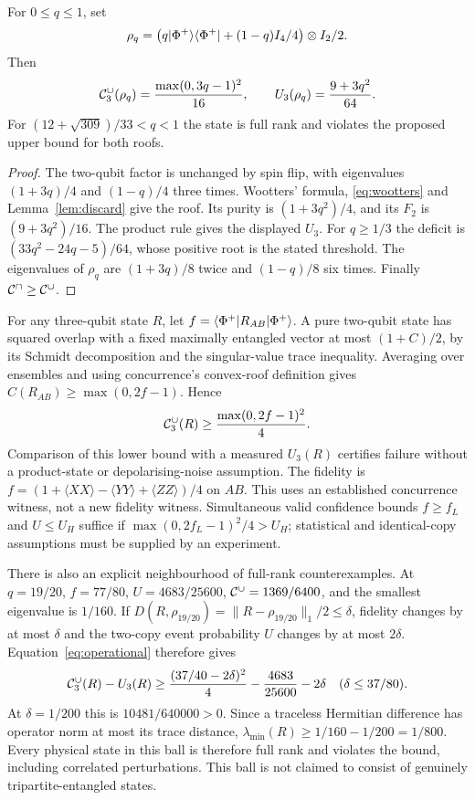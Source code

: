 \begin{theorem}\label{thm:noisy}
For $0\leq q\leq1$, set
\[
\rho_q=\left(q\lvert \Phi^+\rangle\langle \Phi^+\rvert+(1-q)I_4/4\right)\otimes I_2/2.
\]
Then
\[
\mathcal C_3^\cup(\rho_q)=\frac{\max(0,3q-1)^2}{16},\qquad
U_3(\rho_q)=\frac{9+3q^2}{64}.
\]
For $(12+\sqrt{309})/33<q<1$ the state is full rank and violates the proposed upper bound for both roofs.
\end{theorem}
\begin{proof}
The two-qubit factor is unchanged by spin flip, with eigenvalues $(1+3q)/4$ and $(1-q)/4$ three times. Wootters' formula, \eqref{eq:wootters} and Lemma~\ref{lem:discard} give the roof. Its purity is $(1+3q^2)/4$, and its $F_2$ is $(9+3q^2)/16$. The product rule gives the displayed $U_3$. For $q\geq1/3$ the deficit is $(33q^2-24q-5)/64$, whose positive root is the stated threshold. The eigenvalues of $\rho_q$ are $(1+3q)/8$ twice and $(1-q)/8$ six times. Finally $\mathcal C^\cap\geq\mathcal C^\cup$.
\end{proof}

For any three-qubit state $R$, let $f=\langle \Phi^+\rvert R_{AB}\lvert \Phi^+\rangle$. A pure two-qubit state has squared overlap with a fixed maximally entangled vector at most $(1+C)/2$, by its Schmidt decomposition and the singular-value trace inequality. Averaging over ensembles and using concurrence's convex-roof definition gives $C(R_{AB})\geq\max(0,2f-1)$. Hence
\begin{equation}\label{eq:operational}
\mathcal C_3^\cup(R)\geq\frac{\max(0,2f-1)^2}{4}.
\end{equation}
Comparison of this lower bound with a measured $U_3(R)$ certifies failure without a product-state or depolarising-noise assumption. The fidelity is $f=(1+\langle XX\rangle-\langle YY\rangle+\langle ZZ\rangle)/4$ on $AB$. This uses an established concurrence witness, not a new fidelity witness. Simultaneous valid confidence bounds $f\geq f_L$ and $U\leq U_H$ suffice if $\max(0,2f_L-1)^2/4>U_H$; statistical and identical-copy assumptions must be supplied by an experiment.

There is also an explicit neighbourhood of full-rank counterexamples. At $q=19/20$, $f=77/80$, $U=4683/25600$, $\mathcal C^\cup=1369/6400$, and the smallest eigenvalue is $1/160$. If $D(R,\rho_{19/20})=\|R-\rho_{19/20}\|_1/2\leq\delta$, fidelity changes by at most $\delta$ and the two-copy event probability $U$ changes by at most $2\delta$. Equation~\eqref{eq:operational} therefore gives
\[
\mathcal C_3^\cup(R)-U_3(R)\geq\frac{(37/40-2\delta)^2}{4}-\frac{4683}{25600}-2\delta
\quad(\delta\leq37/80).
\]
At $\delta=1/200$ this is $10481/640000>0$. Since a traceless Hermitian difference has operator norm at most its trace distance, $\lambda_{\min}(R)\geq1/160-1/200=1/800$. Every physical state in this ball is therefore full rank and violates the bound, including correlated perturbations. This ball is not claimed to consist of genuinely tripartite-entangled states.

